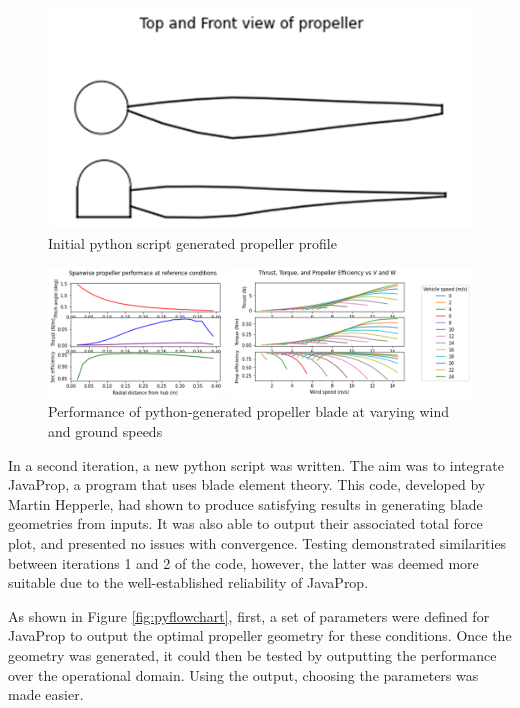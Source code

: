 \begin{figure}[!htbp]
    \centering
    \includegraphics{images/part6/jamescode.png}
    \caption{Initial python script generated propeller profile}
    \label{fig:jamesprop}
\end{figure}
\begin{figure}[!htbp]
    \centering
    \includegraphics{images/part6/jamesresults.png}
    \caption{Performance of python-generated propeller blade at varying wind and ground speeds}
    \label{fig:jamesresults}
\end{figure}

In a second iteration, a new python script was written. The aim was to integrate JavaProp, a program that uses blade element theory. This code, developed by Martin Hepperle, had shown to produce satisfying results in generating blade geometries from inputs. It was also able to output their associated total force plot, and presented no issues with convergence. Testing demonstrated similarities between iterations 1 and 2 of the code, however, the latter was deemed more suitable due to the well-established reliability of JavaProp.

As shown in Figure \ref{fig:pyflowchart}, first, a set of parameters were defined for JavaProp to output the optimal propeller geometry for these conditions. Once the geometry was generated, it could then be tested by outputting the performance over the operational domain. Using the output, choosing the parameters was made easier. 

